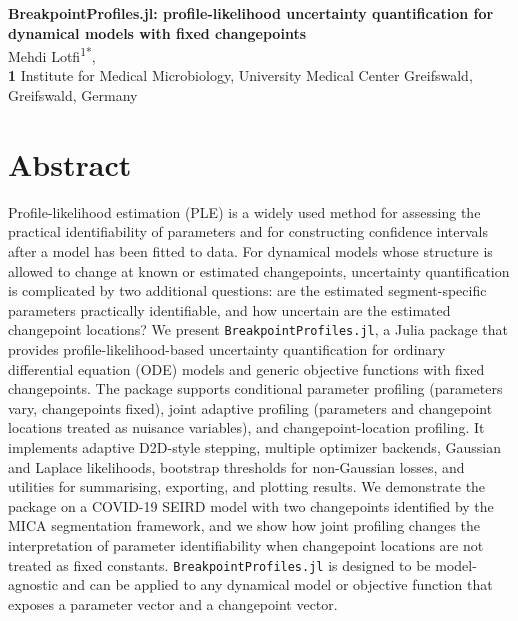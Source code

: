 \documentclass[10pt,letterpaper]{article}
\begin{document}
\vspace*{0.2in}

\begin{flushleft}
{\Large
\textbf{BreakpointProfiles.jl: profile-likelihood uncertainty quantification for dynamical models with fixed changepoints}
}
\newline
\\
Mehdi Lotfi\textsuperscript{1*},
\\
\bigskip
\textbf{1} Institute for Medical Microbiology, University Medical Center Greifswald, Greifswald, Germany
\\
\bigskip
\end{flushleft}

\section*{Abstract}
Profile-likelihood estimation (PLE) is a widely used method for assessing the practical identifiability of parameters and for constructing confidence intervals after a model has been fitted to data. For dynamical models whose structure is allowed to change at known or estimated changepoints, uncertainty quantification is complicated by two additional questions: are the estimated segment-specific parameters practically identifiable, and how uncertain are the estimated changepoint locations? We present \texttt{BreakpointProfiles.jl}, a Julia package that provides profile-likelihood-based uncertainty quantification for ordinary differential equation (ODE) models and generic objective functions with fixed changepoints. The package supports conditional parameter profiling (parameters vary, changepoints fixed), joint adaptive profiling (parameters and changepoint locations treated as nuisance variables), and changepoint-location profiling. It implements adaptive D2D-style stepping, multiple optimizer backends, Gaussian and Laplace likelihoods, bootstrap thresholds for non-Gaussian losses, and utilities for summarising, exporting, and plotting results. We demonstrate the package on a COVID-19 SEIRD model with two changepoints identified by the MICA segmentation framework, and we show how joint profiling changes the interpretation of parameter identifiability when changepoint locations are not treated as fixed constants. \texttt{BreakpointProfiles.jl} is designed to be model-agnostic and can be applied to any dynamical model or objective function that exposes a parameter vector and a changepoint vector.
\end{document}

